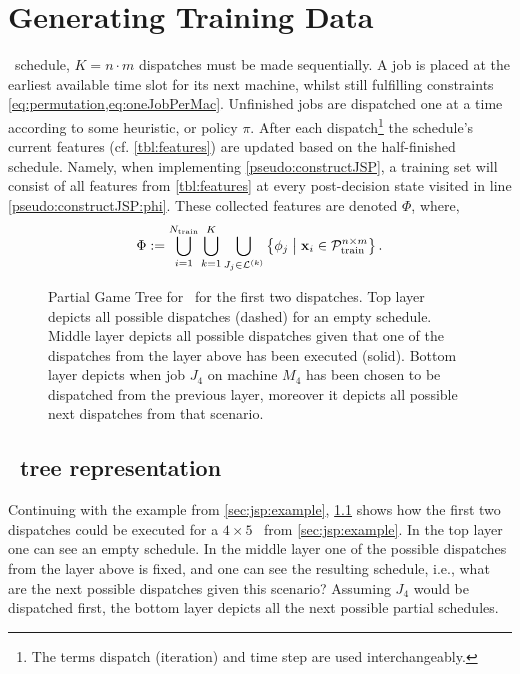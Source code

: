 
\chapter{Generating Training Data}\label{ch:gentrdat} 

 \jsp\ schedule, $K=n\cdot m$ 
dispatches must be made sequentially.
A job is placed at the earliest available time slot for its next machine, 
whilst still fulfilling constraints \cref{eq:permutation,eq:oneJobPerMac}.
Unfinished jobs are dispatched one at a time according to some heuristic, or 
policy $\pi$. 
After each dispatch\footnote{The terms dispatch (iteration) and time step are 
    used interchangeably.} the schedule's current features (cf. 
\cref{tbl:features}) are updated based on the half-finished schedule. Namely, 
when implementing \cref{pseudo:constructJSP}, a training set will consist of 
all features from \cref{tbl:features} at every post-decision state visited in 
line \ref{pseudo:constructJSP:phi}. 
These collected features are denoted $\Phi$, where, 
\begin{equation}\label{eq:Phi}
\Phi:= \bigcup_{i=1}^{N_{\text{train}}} 
\bigcup_{k=1}^K\bigcup_{J_j\in\mathcal{L}^{(k)}} 
\condset{\vphi_j}{\vec{x}_i\in\mathcal{P}^{n\times m}_{\text{train}} }.
\end{equation}

\begin{figure}[p]
    
    \vspace{-27pt}
    \caption[Partial Game Tree for \jsp]{Partial Game Tree for \jsp\ for the 
        first two dispatches. 
        Top layer depicts all possible dispatches (dashed) for an empty 
        schedule. 
        Middle layer depicts all possible dispatches given that one of the 
        dispatches from the layer above has been executed (solid). 
        Bottom layer depicts when job $J_4$ on machine $M_4$ has been chosen to 
        be dispatched from the previous layer, moreover it depicts all possible 
        next dispatches from that scenario.}
    \label{fig:example:gametree}
\end{figure}

\section{\Jsp\ tree representation}\label{sec:gen:gametree}
Continuing with the example from \cref{sec:jsp:example}, 
\cref{fig:example:gametree} shows how the first two dispatches could be 
executed for a $4\times5$ \jsp\ from \cref{sec:jsp:example}.
In the top layer one can see an empty schedule.
In the middle layer one of the possible dispatches from the layer above is 
fixed, and one can see the resulting schedule, i.e., what are the next possible 
dispatches given this scenario? Assuming $J_4$ would be dispatched first, the 
bottom layer depicts all the next possible partial schedules.

